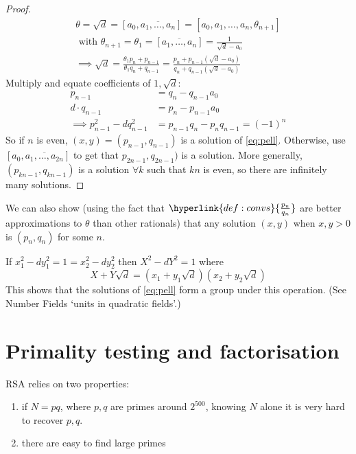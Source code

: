 \documentclass{article}
\begin{document}
\begin{proof}
    \begin{gather*}
        \theta = \sqrt{d} = [a_0, \overline{a_1, \dotsc, a_n}] = [a_0, a_1, \dotsc, a_n, \theta_{n+1}]\\ \text{ with } \theta_{n+1} = \theta_1 = [\overline{a_1, \dotsc, a_n}] = \frac{1}{\sqrt{d} - a_0} \\
        \implies \sqrt{d} = \frac{\theta_1 p_n + p_{n-1}}{\theta_1 q_n + q_{n-1}} = \frac{p_n + p_{n-1} (\sqrt{d} - a_0)}{q_n + q_{n-1} (\sqrt{d} - a_0)}
    \end{gather*}
    Multiply and equate coefficients of $1, \sqrt{d}$:
    \begin{align*}
        p_{n-1} &= q_n - q_{n-1} a_0 \\
        d \cdot q_{n-1} &= p_n - p_{n-1} a_0 \\
        \implies p_{n-1}^2 - d q_{n-1}^2 &= p_{n-1} q_n - p_n q_{n-1} = (-1)^n
    \end{align*}
    So if $n$ is even, $(x, y) = (p_{n-1}, q_{n-1})$ is a solution of \eqref{eq:pell}.
    Otherwise, use $[a_0, \overline{a_1, \dotsc, a_{2n}}]$ to get that $p_{2n-1}, q_{2n-1})$ is a solution.
    More generally, $(p_{kn-1}, q_{kn-1})$ is a solution $\forall k$ such that $kn$ is even, so there are infinitely many solutions.
\end{proof}

\begin{remark}
    We can also show (using the fact that $\hyperlink{def:convs}{\frac{p_n}{q_n}}$ are better approximations to $\theta$ than other rationals) that any solution $(x, y)$ when $x, y > 0$ is $(p_n, q_n)$ for some $n$.
\end{remark}

\begin{remark}
    If $x_1^2 - d y_1^2 = 1 = x_2^2 - d y_2^2$ then $X^2 - d Y^2 = 1$ where
    \begin{equation*}
        X + Y \sqrt{d} = (x_1 + y_1 \sqrt{d})(x_2 + y_2 \sqrt{d})
    \end{equation*}
    This shows that the solutions of \eqref{eq:pell} form a group under this operation. (See Number Fields `units in quadratic fields'.)
\end{remark}

\clearpage
\section{Primality testing and factorisation}
RSA relies on two properties:
\begin{enumerate}
    \item if $N=pq$, where $p, q$ are primes around $2^{500}$, knowing $N$ alone it is very hard to recover $p, q$.
    \item there are easy to find large primes
\end{enumerate}
\end{document}
